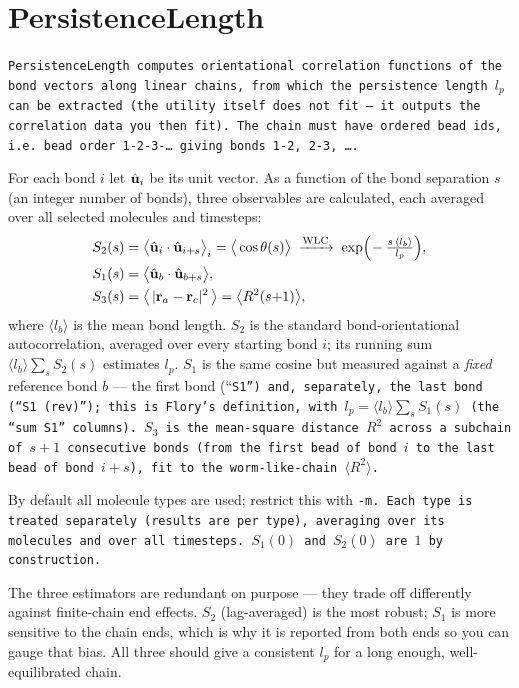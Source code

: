 \section{PersistenceLength} \label{sec:PersistenceLength}

\tt{PersistenceLength} computes orientational correlation functions of the bond
vectors along linear chains, from which the persistence length $l_p$ can be
extracted (the utility itself does not fit --- it outputs the correlation data
you then fit). The chain must have ordered bead ids, i.e.\ bead order
1-2-3-\dots{} giving bonds 1-2, 2-3, \dots.

For each bond $i$ let $\hat{\mathbf{u}}_i$ be its unit vector. As a function of the
bond separation $s$ (an integer number of bonds), three observables are
calculated, each averaged over all selected molecules and timesteps:
\begin{align}
  S_2(s) &= \big\langle \hat{\mathbf{u}}_i\cdot\hat{\mathbf{u}}_{i+s} \big\rangle_i
          = \big\langle \cos\theta(s) \big\rangle
          \;\xrightarrow{\text{WLC}}\;
          \exp\!\Big(\!-\tfrac{s\,\langle l_b\rangle}{l_p}\Big), \\
  S_1(s) &= \big\langle \hat{\mathbf{u}}_b\cdot\hat{\mathbf{u}}_{b+s} \big\rangle, \\
  S_3(s) &= \big\langle\, |\mathbf{r}_a - \mathbf{r}_c|^2 \,\big\rangle
          = \big\langle R^2(s{+}1) \big\rangle,
\end{align}
where $\langle l_b\rangle$ is the mean bond length. $S_2$ is the standard
bond-orientational autocorrelation, averaged over every starting bond $i$; its
running sum $\langle l_b\rangle\sum_s S_2(s)$ estimates $l_p$. $S_1$ is the same
cosine but measured against a \emph{fixed} reference bond $b$ --- the first bond
(``\tt{S1}'') and, separately, the last bond (``\tt{S1 (rev)}''); this is Flory's
definition, with $l_p = \langle l_b\rangle\sum_s S_1(s)$ (the ``\tt{sum S1}''
columns). $S_3$ is the mean-square distance $R^2$ across a subchain of $s+1$
consecutive bonds (from the first bead of bond $i$ to the last bead of bond
$i+s$), fit to the worm-like-chain $\langle R^2\rangle$.

By default all molecule types are used; restrict this with \tt{-m}. Each type is
treated separately (results are per type), averaging over its molecules and over
all timesteps. $S_1(0)$ and $S_2(0)$ are $1$ by construction.

The three estimators are redundant on purpose --- they trade off differently
against finite-chain end effects. $S_2$ (lag-averaged) is the most robust; $S_1$
is more sensitive to the chain ends, which is why it is reported from both ends
so you can gauge that bias. All three should give a consistent $l_p$ for a long
enough, well-equilibrated chain.

